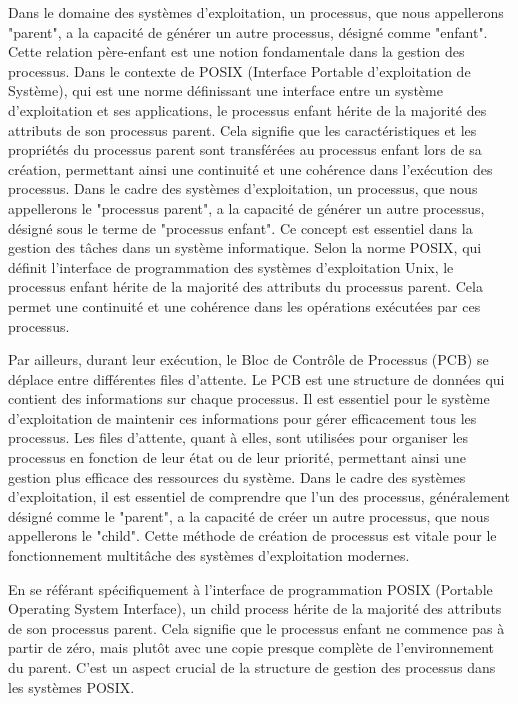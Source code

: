 \documentclass[12pt]{article}
\begin{document}
Dans le domaine des systèmes d'exploitation, un processus, que nous appellerons "parent", a la capacité de générer un autre processus, désigné comme "enfant". Cette relation père-enfant est une notion fondamentale dans la gestion des processus. Dans le contexte de POSIX (Interface Portable d'exploitation de Système), qui est une norme définissant une interface entre un système d'exploitation et ses applications, le processus enfant hérite de la majorité des attributs de son processus parent. Cela signifie que les caractéristiques et les propriétés du processus parent sont transférées au processus enfant lors de sa création, permettant ainsi une continuité et une cohérence dans l'exécution des processus.
Dans le cadre des systèmes d'exploitation, un processus, que nous appellerons le "processus parent", a la capacité de générer un autre processus, désigné sous le terme de "processus enfant". Ce concept est essentiel dans la gestion des tâches dans un système informatique. Selon la norme POSIX, qui définit l'interface de programmation des systèmes d'exploitation Unix, le processus enfant hérite de la majorité des attributs du processus parent. Cela permet une continuité et une cohérence dans les opérations exécutées par ces processus.

Par ailleurs, durant leur exécution, le Bloc de Contrôle de Processus (PCB) se déplace entre différentes files d'attente. Le PCB est une structure de données qui contient des informations sur chaque processus. Il est essentiel pour le système d'exploitation de maintenir ces informations pour gérer efficacement tous les processus. Les files d'attente, quant à elles, sont utilisées pour organiser les processus en fonction de leur état ou de leur priorité, permettant ainsi une gestion plus efficace des ressources du système.
Dans le cadre des systèmes d'exploitation, il est essentiel de comprendre que l'un des processus, généralement désigné comme le "parent", a la capacité de créer un autre processus, que nous appellerons le "child". Cette méthode de création de processus est vitale pour le fonctionnement multitâche des systèmes d'exploitation modernes.

En se référant spécifiquement à l'interface de programmation POSIX (Portable Operating System Interface), un child process hérite de la majorité des attributs de son processus parent. Cela signifie que le processus enfant ne commence pas à partir de zéro, mais plutôt avec une copie presque complète de l'environnement du parent. C'est un aspect crucial de la structure de gestion des processus dans les systèmes POSIX.
\end{document}
